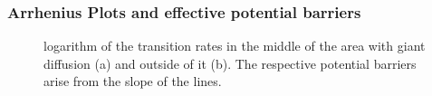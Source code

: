 \documentclass[12pt,a4paper]{article}
\begin{document}
\subsubsection{Arrhenius Plots and effective potential barriers}
\begin{figure}[H]
	\hspace*{-0.5cm}
	\caption{logarithm of the transition rates in the middle of the area with giant diffusion (a) and outside of it (b). The respective potential barriers arise from the slope of the lines.}
	\label{arrhplotsanhopf}
\end{figure}
\end{document}
